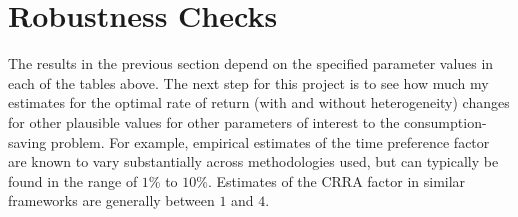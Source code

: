 \documentclass[\econtexRoot/Chp1proposal]{subfiles}
\begin{document}
\hypertarget{extensions}{}
\section{Robustness Checks}\notinsubfile{\label{sec:robustness}}

\par The results in the previous section depend on the specified parameter values in each of the tables above. The next step for this project is to see how much my estimates for the optimal rate of return (with and without heterogeneity) changes for other plausible values for other parameters of interest to the consumption-saving problem. For example, empirical estimates of the time preference factor are known to vary substantially across methodologies used, but can typically be found in the range of $1$\% to $10$\%. Estimates of the CRRA factor in similar frameworks are generally between $1$ and $4$.





\onlyinsubfile{}

\end{document}
